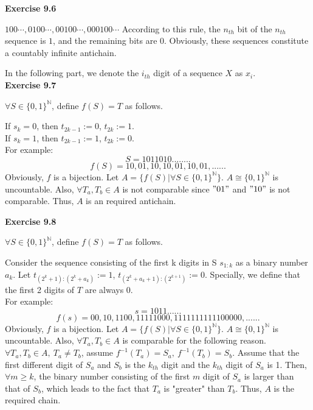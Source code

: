 \documentclass{article} %
\begin{document}
	\textbf{Exercise 9.6}\par
	$100\cdots,0100\cdots,00100\cdots,000100\cdots$ According to this rule, the $n_{th}$ bit of the $n_{th}$ sequence is $1$, and the remaining bits are $0$. Obviously, these sequences constitute a countably infinite antichain.\par

In the following part, we denote the $i_{th}$ digit of a sequence $X$ as $x_i$.\\

	\textbf{Exercise 9.7}\par
	$\forall S\in {\{0,1\}}^{\mathbb{N}}$, define $f(S)=T$ as follows.\par
	If $s_k=0$, then $t_{2k-1}:=0$, $t_{2k}:=1$.\\ If $s_k=1$, then $t_{2k-1}:=1$, $t_{2k}:=0$.\\
	For example:\\
	$$
	S=1011010........
	$$
	$$
	f(S)=10,01,10,10,01,10,01,......
	$$
	Obviously, $f$ is a bijection. Let $A=\{f(S)|\forall S\in {\{0,1\}}^{\mathbb{N}}\}$. $A\cong {\{0,1\}}^{\mathbb{N}}$ is uncountable. Also, $\forall T_{a},T_{b}\in A$ is not comparable since $"01"$ and $"10"$ is not comparable.
	Thus, $A$ is an required antichain.\par
	\textbf{Exercise 9.8}\par
	 $\forall S\in {\{0,1\}}^{\mathbb{N}}$, define $f(S)=T$ as follows.\par
	 
	 	 Consider the sequence consisting of the first k digits in S $s_{1:k}$ as a binary number $a_k$. Let $t_{(2^{k}+1):(2^{k}+a_k)}:=1$, $t_{(2^{k}+a_k+1):(2^{k+1})}:=0$. Specially, we define that the first 2 digits of $T$ are always $0$.\\  
	 
	 For example:\\
	 $$
	 s=1011......
	 $$
	 $$
	 f(s)=00,10,1100,11111000,1111111111100000,......
	 $$
	 Obviously, $f$ is a bijection. Let $A=\{f(S)|\forall S\in {\{0,1\}}^{\mathbb{N}}\}$. $A\cong {\{0,1\}}^{\mathbb{N}}$ is uncountable. Also, $\forall T_a,T_b\in A$ is comparable for the following reason.\\
 $\forall T_a,T_b\in A,\ T_a\neq T_b$, assume $f^{-1}(T_a)=S_a,\ f^{-1}(T_b)=S_b$. Assume that the first different digit of $S_a$ and $S_b$ is the $k_{th}$ digit and the $k_{th}$ digit of $S_a$ is 1. Then, $\forall m \ge k$, the binary number consisting of the first $m$ digit of $S_a$ is larger than that of $S_b$, which leads to the fact that $T_a$ is "greater" than $T_b$. Thus, $A$ is the required chain. \par
\end{document}
